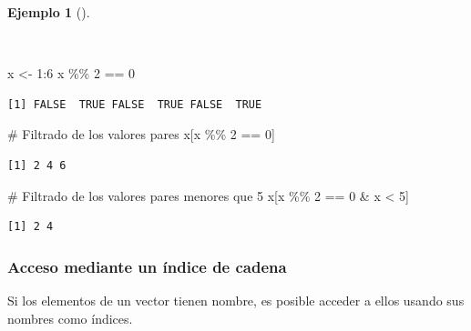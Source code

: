 \documentclass[
  spanish,
  a4paper,
]{scrreport}
\newenvironment{Shaded}{\begin{snugshade}}{\end{snugshade}}
\newcommand{\CommentTok}[1]{\textcolor[rgb]{0.37,0.37,0.37}{#1}}
\newcommand{\DecValTok}[1]{\textcolor[rgb]{0.68,0.00,0.00}{#1}}
\newcommand{\NormalTok}[1]{\textcolor[rgb]{0.00,0.23,0.31}{#1}}
\newcommand{\OtherTok}[1]{\textcolor[rgb]{0.00,0.23,0.31}{#1}}
\newcommand{\SpecialCharTok}[1]{\textcolor[rgb]{0.37,0.37,0.37}{#1}}
\theoremstyle{definition}
\theoremstyle{definition}
\newtheorem{example}{Ejemplo}[chapter]
\theoremstyle{remark}
\begin{document}
\begin{example}[]\protect\hypertarget{exm-filtros}{}\label{exm-filtros}

~

\begin{Shaded}
\begin{Highlighting}[]
\NormalTok{x }\OtherTok{\textless{}{-}} \DecValTok{1}\SpecialCharTok{:}\DecValTok{6}
\NormalTok{x }\SpecialCharTok{\%\%} \DecValTok{2} \SpecialCharTok{==} \DecValTok{0}
\end{Highlighting}
\end{Shaded}

\begin{verbatim}
[1] FALSE  TRUE FALSE  TRUE FALSE  TRUE
\end{verbatim}

\begin{Shaded}
\begin{Highlighting}[]
\CommentTok{\# Filtrado de los valores pares}
\NormalTok{x[x }\SpecialCharTok{\%\%} \DecValTok{2} \SpecialCharTok{==} \DecValTok{0}\NormalTok{]}
\end{Highlighting}
\end{Shaded}

\begin{verbatim}
[1] 2 4 6
\end{verbatim}

\begin{Shaded}
\begin{Highlighting}[]
\CommentTok{\# Filtrado de los valores pares menores que 5}
\NormalTok{x[x }\SpecialCharTok{\%\%} \DecValTok{2} \SpecialCharTok{==} \DecValTok{0} \SpecialCharTok{\&}\NormalTok{ x }\SpecialCharTok{\textless{}} \DecValTok{5}\NormalTok{]}
\end{Highlighting}
\end{Shaded}

\begin{verbatim}
[1] 2 4
\end{verbatim}

\end{example}

\subsubsection{Acceso mediante un índice de
cadena}\label{acceso-mediante-un-uxedndice-de-cadena}

Si los elementos de un vector tienen nombre, es posible acceder a ellos
usando sus nombres como índices.
\end{document}
